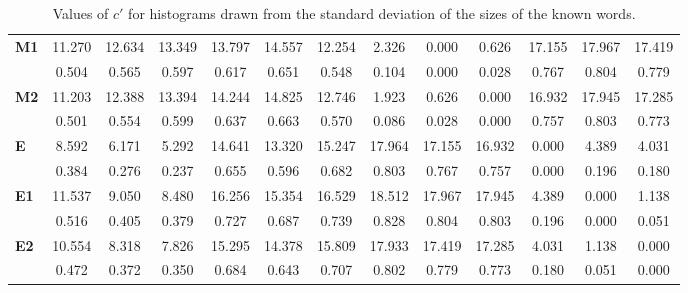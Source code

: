 \begin{table*}[h!]
\begin{center}
\begin{tabular}{| l || c | c | c || c | c | c || c | c | c || c | c | c |}
{\bf M1} & 11.270 & 12.634 & 13.349 & 13.797 & 14.557 & 12.254 & 2.326 & 0.000 & 0.626 & 17.155 & 17.967 & 17.419 \\
 & 0.504  & 0.565  & 0.597  & 0.617  & 0.651  & 0.548  & 0.104  & 0.000  & 0.028  & 0.767  & 0.804  & 0.779 \\\hline
{\bf M2} & 11.203 & 12.388 & 13.394 & 14.244 & 14.825 & 12.746 & 1.923 & 0.626 & 0.000 & 16.932 & 17.945 & 17.285 \\
 & 0.501  & 0.554  & 0.599  & 0.637  & 0.663  & 0.570  & 0.086  & 0.028  & 0.000  & 0.757  & 0.803  & 0.773 \\\hline\hline
{\bf E} & 8.592 & 6.171 & 5.292 & 14.641 & 13.320 & 15.247 & 17.964 & 17.155 & 16.932 & 0.000 & 4.389 & 4.031 \\
 & 0.384  & 0.276  & 0.237  & 0.655  & 0.596  & 0.682  & 0.803  & 0.767  & 0.757  & 0.000  & 0.196  & 0.180 \\\hline
{\bf E1} & 11.537 & 9.050 & 8.480 & 16.256 & 15.354 & 16.529 & 18.512 & 17.967 & 17.945 & 4.389 & 0.000 & 1.138 \\
 & 0.516  & 0.405  & 0.379  & 0.727  & 0.687  & 0.739  & 0.828  & 0.804  & 0.803  & 0.196  & 0.000  & 0.051 \\\hline
{\bf E2} & 10.554 & 8.318 & 7.826 & 15.295 & 14.378 & 15.809 & 17.933 & 17.419 & 17.285 & 4.031 & 1.138 & 0.000 \\
 & 0.472  & 0.372  & 0.350  & 0.684  & 0.643  & 0.707  & 0.802  & 0.779  & 0.773  & 0.180  & 0.051  & 0.000 \\\hline
\end{tabular}
\caption{Values of $c'$ for histograms drawn from the standard deviation of the sizes of the known words.}
\end{center}
\end{table*}